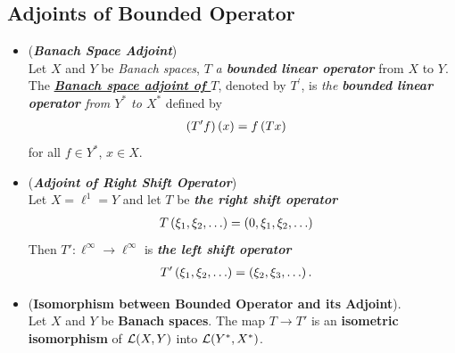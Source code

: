 \documentclass[11pt]{article}
\begin{document}
\subsection{Adjoints of Bounded Operator}
\begin{itemize}
\item \begin{definition} (\emph{\textbf{Banach Space Adjoint}})\\
Let $X$ and $Y$ be \emph{Banach spaces},  $T$ \emph{a \textbf{bounded linear operator}} from $X$ to $Y$. The \underline{\emph{\textbf{Banach space adjoint of $T$}}}, denoted by $T^{'}$, is \emph{the \textbf{bounded linear operator} from $Y^{*}$ to $X^{*}$} defined by 
\begin{align*}
\left(T'f\right)(x) &= f\left(Tx\right)
\end{align*} for all $f \in Y^{*}$, $x \in X$. 
\end{definition}

\item \begin{example} (\emph{\textbf{Adjoint of Right Shift Operator}})\\
Let $X = \ell^1 = Y$ and let $Τ$ be \emph{\textbf{the right shift operator}}
\begin{align*}
T\left(\xi_1, \xi_2, \ldots\right) &= \left(0, \xi_1, \xi_2, \ldots\right)
\end{align*}
Then $T':  \ell^{\infty} \rightarrow \ell^{\infty}$ is \emph{\textbf{the left shift  operator}} 
\begin{align*}
T'\left(\xi_1, \xi_2, \ldots\right) &= \left(\xi_2, \xi_3, \ldots\right).
\end{align*}
\end{example}

\item \begin{proposition} (\textbf{Isomorphism between Bounded Operator and its Adjoint}). \citep{reed1980methods}\\
Let $X$ and $Y$ be \textbf{Banach spaces}. The map $T \rightarrow T'$ is an \textbf{isometric isomorphism} of  ${\mathcal L}(X, Y)$ into ${\mathcal L}(Y^{*}, X^{*})$. 
\end{proposition}


\end{itemize}
\end{document}
